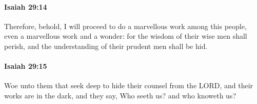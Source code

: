 		\paragraph{Isaiah 29:14} %
			\label{ISAIAH-29-14}

			Therefore, behold, I will proceed to do a marvellous work among this people, even a marvellous work and a wonder: for the wisdom of their wise men shall perish, and the understanding of their prudent men shall be hid.


		\paragraph{Isaiah 29:15} %
			\label{ISAIAH-29-15}

			Woe unto them that seek deep to hide their counsel from the LORD, and their works are in the dark, and they say, Who seeth us? and who knoweth us?


